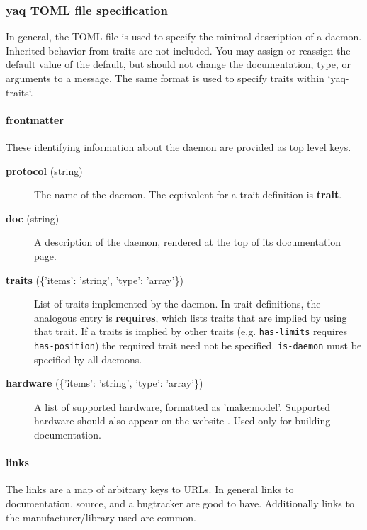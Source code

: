 \hypertarget{yaq-toml-file-specification}{%
\subsubsection{yaq TOML file
specification}\label{yaq-toml-file-specification}}

In general, the TOML file is used to specify the minimal description of
a daemon. Inherited behavior from traits are not included. You may
assign or reassign the default value of the default, but should not
change the documentation, type, or arguments to a message. The same
format is used to specify traits within `yaq-traits`.

\hypertarget{frontmatter}{%
\paragraph{frontmatter}\label{frontmatter}}

These identifying information about the daemon are provided as top level
keys.

\begin{description}
\item[\textbf{protocol} (string)]
The name of the daemon. The equivalent for a trait definition is
\textbf{trait}.
\item[\textbf{doc} (string)]
A description of the daemon, rendered at the top of its documentation
page.
\item[\textbf{traits} (\{'items': 'string', 'type': 'array'\})]
List of traits implemented by the daemon. In trait definitions, the
analogous entry is \textbf{requires}, which lists traits that are
implied by using that trait. If a traits is implied by other traits
(e.g. \texttt{has-limits} requires \texttt{has-position}) the required
trait need not be specified. \texttt{is-daemon} must be specified by all
daemons.
\item[\textbf{hardware} (\{'items': 'string', 'type': 'array'\})]
A list of supported hardware, formatted as 'make:model'. Supported
hardware should also appear on the \yaq{} website \cite{yaq-known-hardware}.
Used only for building documentation.
\end{description}

\hypertarget{links}{%
\paragraph{links}\label{links}}

The links are a map of arbitrary keys to URLs. In general links to
documentation, source, and a bugtracker are good to have. Additionally
links to the manufacturer/library used are common.

